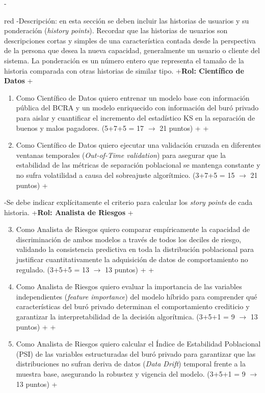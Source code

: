 \documentclass[
 11pt, %
-%
+codirector, %
 ]{charter}
\begin{document}
\begin{table}[ht]
\begin{table}[ht]
-\begin{consigna}{red}
-Descripción: en esta sección se deben incluir las historias de usuarios y su ponderación (\textit{history points}). Recordar que las historias de usuarios son descripciones cortas y simples de una característica contada desde la perspectiva de la persona que desea la nueva capacidad, generalmente un usuario o cliente del sistema. La ponderación es un número entero que representa el tamaño de la historia comparada con otras historias de similar tipo.
+\textbf{Rol: Científico de Datos}
+\begin{enumerate}
+    \item Como Científico de Datos quiero entrenar un modelo base con información pública del BCRA y un modelo enriquecido con información del buró privado para aislar y cuantificar el incremento del estadístico KS en la separación de buenos y malos pagadores. (5+7+5 = 17 $\rightarrow$ 21 puntos)
+    
+    \item Como Científico de Datos quiero ejecutar una validación cruzada en diferentes ventanas temporales (\textit{Out-of-Time validation}) para asegurar que la estabilidad de las métricas de separación poblacional se mantenga constante y no sufra volatilidad a causa del sobreajuste algorítmico. (3+7+5 = 15 $\rightarrow$ 21 puntos)
+\end{enumerate}
 
-Se debe indicar explícitamente el criterio para calcular los \textit{story points} de cada historia.
+\textbf{Rol: Analista de Riesgos}
+\begin{enumerate}\setcounter{enumi}{2}
+    \item Como Analista de Riesgos quiero comparar empíricamente la capacidad de discriminación de ambos modelos a través de todos los deciles de riesgo, validando la consistencia predictiva en toda la distribución poblacional para justificar cuantitativamente la adquisición de datos de comportamiento no regulado. (3+5+5 = 13 $\rightarrow$ 13 puntos)
+    
+    \item Como Analista de Riesgos quiero evaluar la importancia de las variables independientes (\textit{feature importance}) del modelo híbrido para comprender qué características del buró privado determinan el comportamiento crediticio y garantizar la interpretabilidad de la decisión algorítmica. (3+5+1 = 9 $\rightarrow$ 13 puntos)
+    
+    \item Como Analista de Riesgos quiero calcular el Índice de Estabilidad Poblacional (PSI) de las variables estructuradas del buró privado para garantizar que las distribuciones no sufran deriva de datos (\textit{Data Drift}) temporal frente a la muestra base, asegurando la robustez y vigencia del modelo. (3+5+1 = 9 $\rightarrow$ 13 puntos)
+\end{enumerate}
 

\end{consigna}
\end{table}
\end{table}
\end{document}
